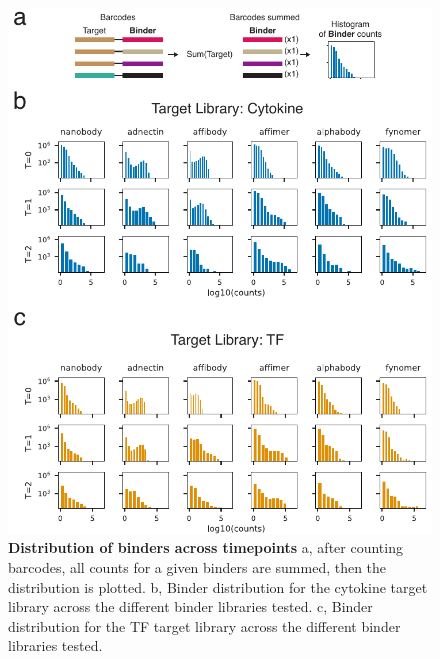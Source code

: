 \begin{figure}
\includegraphics[width=\textwidth]{figures/chapter3/20190621_fig5_binder_histograms.pdf}
\caption[Distribution of binders across timepoints]{\textbf{Distribution of binders across timepoints}
a, after counting barcodes, all counts for a given binders are summed, then the distribution is plotted. b, Binder distribution for the cytokine target library across the different binder libraries tested. c, Binder distribution for the TF target library across the different binder libraries tested.
\label{chap3-binder-histograms}}
\end{figure}

